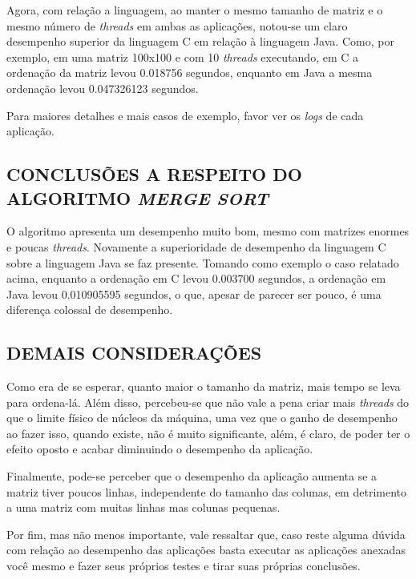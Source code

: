		Agora, com relação a linguagem, ao manter o mesmo tamanho de matriz e o mesmo número de \textit{threads} em ambas as aplicações, notou-se um claro desempenho superior da linguagem C em relação à linguagem Java. Como, por exemplo, em uma matriz 100x100 e com 10 \textit{threads} executando, em C a ordenação da matriz levou 0.018756 segundos, enquanto em Java a mesma ordenação levou 0.047326123 segundos. 
		
		Para maiores detalhes e mais casos de exemplo, favor ver os \textit{logs} de cada aplicação.
		
	\subsection{\normalsize CONCLUSÕES A RESPEITO DO ALGORITMO \textit{MERGE SORT}}
		O algoritmo apresenta um desempenho muito bom, mesmo com matrizes enormes e poucas \textit{threads}. Novamente a superioridade de desempenho da linguagem C sobre a linguagem Java se faz presente. Tomando como exemplo o caso relatado acima, enquanto a ordenação em C levou 0.003700 segundos, a ordenação em Java levou 0.010905595 segundos, o que, apesar de parecer ser pouco, é uma diferença colossal de desempenho.
		
	\subsection{\normalsize DEMAIS CONSIDERAÇÕES}
		Como era de se esperar, quanto maior o tamanho da matriz, mais tempo se leva para ordena-lá. Além disso, percebeu-se que não vale a pena criar mais \textit{threads} do que o limite físico de núcleos da máquina, uma vez que o ganho de desempenho ao fazer isso, quando existe, não é muito significante, além, é claro, de poder ter o efeito oposto e acabar diminuindo o desempenho da aplicação.
		
		Finalmente, pode-se perceber que o desempenho da aplicação aumenta se a matriz tiver poucos linhas, independente do tamanho das colunas, em detrimento a uma matriz com muitas linhas mas colunas pequenas.
		
		Por fim, mas não menos importante, vale ressaltar que, caso reste alguma dúvida com relação ao desempenho das aplicações basta executar as aplicações anexadas você mesmo e fazer seus próprios testes e tirar suas próprias conclusões. 